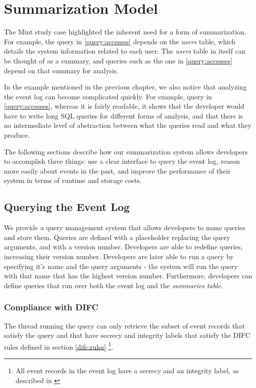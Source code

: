 \chapter{Summarization Model}

The Mint study case highlighted the inherent need for a form of summarization. For example, the query in \ref{query:accesses} depends on the \emph{users} table, which details the system information related to each user. The \emph{users} table in itself can be thought of as a summary, and queries such as the one in \ref{query:accesses} depend on that summary for analysis.

In the example mentioned in the previous chapter, we also notice that analyzing the event log can become complicated quickly. For example, query in \ref{query:accesses}, whereas it is fairly readable, it shows that the developer would have to write long SQL queries for different forms of analysis, and that there is no intermediate level of abstraction between what the queries read and what they produce.

The following sections describe how our summarization system allows developers to accomplish three things: use a clear interface to query the event log, reason more easily about events in the past, and improve the performance of their system in terms of runtime and storage costs.

\section{Querying the Event Log}

We provide a query management system that allows developers to name queries and store them. Queries are defined with a placeholder replacing the query arguments, and with a version number. Developers are able to redefine queries, increasing their version number. Developers are later able to run a query by specifying it's name and the query arguments - the system will run the query with that name that has the highest version number. Furthermore, developers can define queries that run over both the event log and the \emph{summaries table}.

\subsection{Compliance with DIFC}

The thread running the query can only retrieve the subset of event records that satisfy the query and that have secrecy and integrity labels that satisfy the DIFC rules defined in section \ref{difc:rules}
\footnote{All event records in the event log have a secrecy and an integrity label, as described in \cite{blanks}}. 


